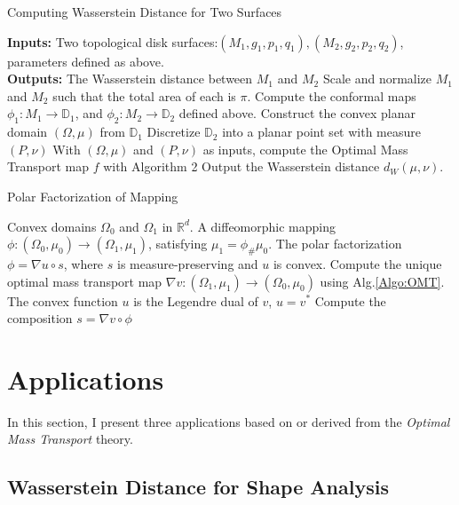 \documentclass[runningheads]{llncs}
\begin{document}
\begin{algorithm}\label{Algo:WasDis}
\caption{Computing Wasserstein Distance for Two Surfaces}
\begin{algorithmic}[1]
\REQUIRE \textbf{Inputs:} Two topological disk surfaces:$(M_1,g_1,p_1,q_1), (M_2,g_2,p_2,q_2)$, parameters defined as above. \\
\textbf{Outputs:} The Wasserstein distance between $M_1$ and $M_2$
\STATE Scale and normalize $M_1$ and $M_2$ such that the total area of each is $\pi$.
\STATE Compute the conformal maps $\phi_1:M_1\rightarrow \mathbb{D}_1$, and $\phi_2:M_2\rightarrow \mathbb{D}_2$ defined above.
\STATE Construct the convex planar domain $(\Omega,\mu)$ from $\mathbb{D}_1$
\STATE Discretize $\mathbb{D}_2$ into a planar point set with measure $(P,\nu)$
\STATE With $(\Omega, \mu)$ and $(P,\nu)$ as inputs, compute the Optimal Mass Transport map $f$ with Algorithm 2
\STATE Output the Wasserstein distance $d_W(\mu,\nu)$.
\end{algorithmic}
\end{algorithm}

\clearpage



\begin{algorithm}[H]
\caption{Polar Factorization of Mapping}
\begin{algorithmic}
\REQUIRE Convex domains $\Omega_0$ and $\Omega_1$ in $\mathbb{R}^d$. A diffeomorphic mapping $\phi:(\Omega_0,\mu_0)\rightarrow (\Omega_1, \mu_1)$, satisfying $\mu_1=\phi_\#\mu_0$.
\ENSURE The polar factorization $\phi = \nabla u\circ s$, where $s$ is measure-preserving and $u$ is convex.
\STATE Compute the unique optimal mass transport map $\nabla v:(\Omega_1, \mu_1)\rightarrow (\Omega_0,\mu_0)$ using Alg.\ref{Algo:OMT}. The convex function $u$ is the Legendre dual of $v$, $u=v^*$
\STATE Compute the composition $s=\nabla v\circ\phi$
\end{algorithmic}
\label{Algo:PolarFac}
\end{algorithm}




\section{Applications}


In this section, I present three applications based on or derived from the \textit{Optimal Mass Transport} theory.


\subsection{Wasserstein Distance for Shape Analysis}
\end{document}
